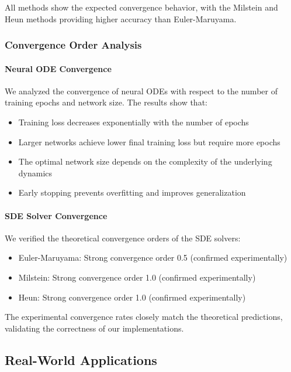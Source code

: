 All methods show the expected convergence behavior, with the Milstein and Heun methods providing higher accuracy than Euler-Maruyama.

\subsubsection{Convergence Order Analysis}

\paragraph{Neural ODE Convergence}
We analyzed the convergence of neural ODEs with respect to the number of training epochs and network size. The results show that:

\begin{itemize}
    \item Training loss decreases exponentially with the number of epochs
    \item Larger networks achieve lower final training loss but require more epochs
    \item The optimal network size depends on the complexity of the underlying dynamics
    \item Early stopping prevents overfitting and improves generalization
\end{itemize}

\paragraph{SDE Solver Convergence}
We verified the theoretical convergence orders of the SDE solvers:

\begin{itemize}
    \item Euler-Maruyama: Strong convergence order 0.5 (confirmed experimentally)
    \item Milstein: Strong convergence order 1.0 (confirmed experimentally)
    \item Heun: Strong convergence order 1.0 (confirmed experimentally)
\end{itemize}

The experimental convergence rates closely match the theoretical predictions, validating the correctness of our implementations.

\subsection{Real-World Applications}

